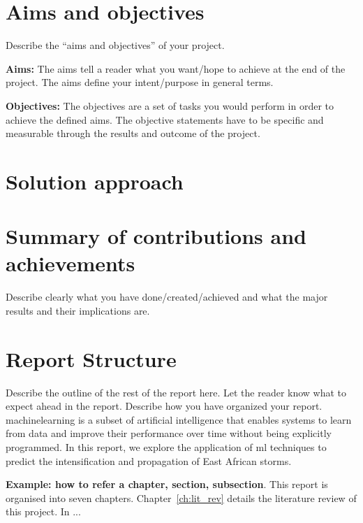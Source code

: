 \section{Aims and objectives}
\label{sec:intro_aims_obj}
Describe the ``aims and objectives'' of your project. 

\textbf{Aims:} The aims tell a reader what you want/hope to achieve at the end of the project. The  aims define your intent/purpose in general terms.  

\textbf{Objectives:} The objectives are a set of tasks you would perform in order to achieve the defined aims. The objective statements have to be specific and measurable through the results and outcome of the project.

\section{Solution approach}
\label{sec:intro_sol}

\section{Summary of contributions and achievements}
\label{sec:intro_sum_results}
Describe clearly what you have done/created/achieved and what the major results and their implications are. 


\section{Report Structure}
\label{sec:intro_org}
Describe the outline of the rest of the report here. Let the reader know what to expect ahead in the report. Describe how you have organized your report. 
\Gls{machinelearning} is a subset of artificial intelligence that enables systems to learn from data and improve their performance over time without being explicitly programmed. In this report, we explore the application of \gls{ml} techniques to predict the intensification and propagation of East African storms.

\textbf{Example: how to refer a chapter, section, subsection}. This report is organised into seven chapters. Chapter~\ref{ch:lit_rev} details the literature review of this project. In ...  %


